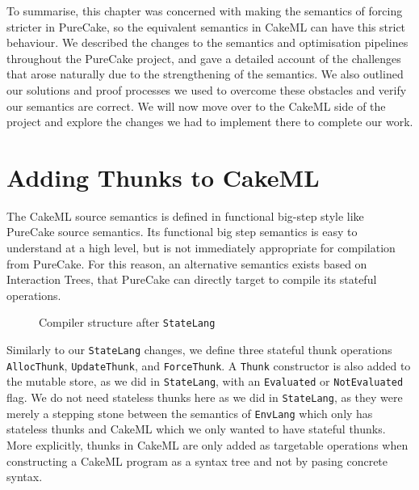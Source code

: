 \documentclass[sigconf]{acmart}
\newcommand{\hsinl}[1]{\texttt{#1}}
\newcommand{\code}[1]{\texttt{#1}}
\newcommand{\EnvLang}{\code{EnvLang}}
\newcommand{\StateLang}{\code{StateLang}}
\begin{document}
To summarise, this chapter was concerned with making the semantics of forcing
stricter in PureCake, so the equivalent semantics in CakeML can have this strict
behaviour. We described the changes to the semantics and optimisation pipelines
throughout the PureCake project, and gave a detailed account of the challenges
that arose naturally due to the strengthening of the semantics. We also outlined
our solutions and proof processes we used to overcome these obstacles and verify
our semantics are correct. We will now move over to the CakeML side of the
project and explore the changes we had to implement there to complete our work.

\section{Adding Thunks to CakeML}

The CakeML source semantics is defined in functional big-step style like
PureCake source semantics. Its functional big step semantics is easy to
understand at a high level, but is not immediately appropriate for compilation
from PureCake. For this reason, an alternative semantics exists based on
Interaction Trees, that PureCake can directly target to compile its stateful
operations.
\begin{figure}[h]
  \centering
  
  \caption{Compiler structure after \StateLang{}}
  \Description{Compiler structure after \StateLang{}}
\end{figure}

Similarly to our \StateLang{} changes, we define three stateful thunk operations
\hsinl{AllocThunk}, \hsinl{UpdateThunk}, and \hsinl{ForceThunk}. A \hsinl{Thunk}
constructor is also added to the mutable store, as we did in \StateLang{}, with
an \hsinl{Evaluated} or \hsinl{NotEvaluated} flag. We do not need stateless
thunks here as we did in \StateLang{}, as they were merely a stepping stone
between the semantics of \EnvLang{} which only has stateless thunks and CakeML
which we only wanted to have stateful thunks. More explicitly, thunks in CakeML
are only added as targetable operations when constructing a CakeML program as a
syntax tree and not by pasing concrete syntax.
\end{document}
